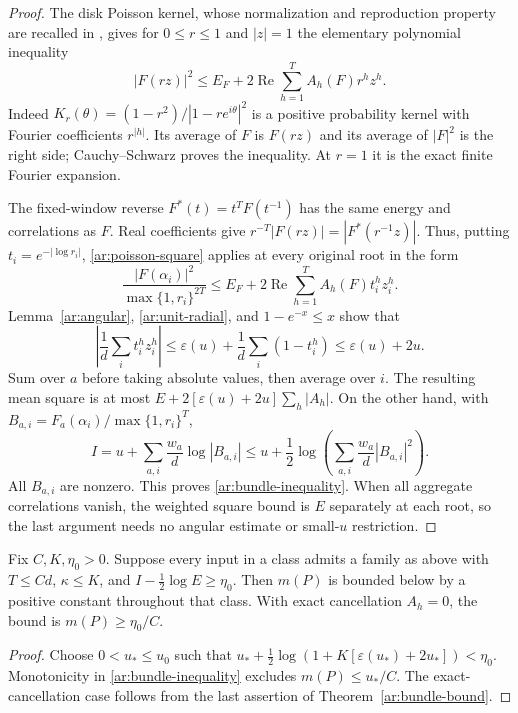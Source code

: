 \begin{proof}
The disk Poisson kernel, whose normalization and reproduction property are recalled in \cite[Chapter~1]{ABR01}, gives for $0\le r\le1$ and $|z|=1$ the elementary polynomial inequality
\begin{equation}
 |F(rz)|^2\le E_F+2\operatorname{Re}
                 \sum_{h=1}^T A_h(F)r^hz^h.
 \label{ar:poisson-square}
\end{equation}
Indeed $K_r(\theta)=(1-r^2)/|1-re^{i\theta}|^2$ is a positive probability kernel with Fourier coefficients $r^{|h|}$.
Its average of $F$ is $F(rz)$ and its average of $|F|^2$ is the right side; Cauchy--Schwarz proves the inequality.
At $r=1$ it is the exact finite Fourier expansion.

The fixed-window reverse $F^*(t)=t^TF(t^{-1})$ has the same energy and correlations as $F$.
Real coefficients give $r^{-T}|F(rz)|=|F^*(r^{-1}z)|$.
Thus, putting $t_i=e^{-|\log r_i|}$, \eqref{ar:poisson-square} applies at every original root in the form
\[
 \frac{|F(\alpha_i)|^2}{\max\{1,r_i\}^{2T}}
 \le E_F+2\operatorname{Re}\sum_{h=1}^T A_h(F)t_i^hz_i^h.
\]
Lemma~\ref{ar:angular}, \eqref{ar:unit-radial}, and $1-e^{-x}\le x$ show that
\[
 \left|\frac1d\sum_i t_i^hz_i^h\right|
 \le\varepsilon(u)+\frac1d\sum_i(1-t_i^h)
 \le\varepsilon(u)+2u.
\]
Sum over $a$ before taking absolute values, then average over $i$.
The resulting mean square is at most $E+2[\varepsilon(u)+2u]\sum_h|A_h|$.
On the other hand, with $B_{a,i}=F_a(\alpha_i)/\max\{1,r_i\}^T$,
\[
 I=u+\sum_{a,i}\frac{w_a}{d}\log|B_{a,i}|
 \le u+\frac12\log\left(\sum_{a,i}\frac{w_a}{d}|B_{a,i}|^2\right).
\]
All $B_{a,i}$ are nonzero.
This proves \eqref{ar:bundle-inequality}.
When all aggregate correlations vanish, the weighted square bound is $E$ separately at each root, so the last argument needs no angular estimate or small-$u$ restriction.
\end{proof}

\begin{corollary}\label{ar:conditional-gap}
Fix $C,K,\eta_0>0$.
Suppose every input in a class admits a family as above with $T\le Cd$, $\kappa\le K$, and $I-\frac12\log E\ge\eta_0$.
Then $m(P)$ is bounded below by a positive constant throughout that class.
With exact cancellation $A_h=0$, the bound is $m(P)\ge\eta_0/C$.
\end{corollary}

\begin{proof}
Choose $0<u_*\le u_0$ such that $u_*+\frac12\log(1+K[\varepsilon(u_*)+2u_*])<\eta_0$.
Monotonicity in \eqref{ar:bundle-inequality} excludes $m(P)\le u_*/C$.
The exact-cancellation case follows from the last assertion of Theorem~\ref{ar:bundle-bound}.
\end{proof}

